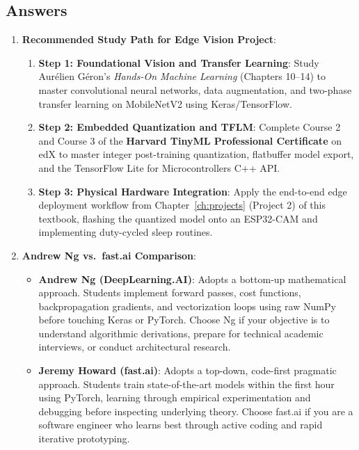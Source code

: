 \subsection*{Answers}

\begin{enumerate}
    \item \textbf{Recommended Study Path for Edge Vision Project}:
    \begin{enumerate}
        \item \textbf{Step 1: Foundational Vision and Transfer Learning}: Study Aurélien Géron's \emph{Hands-On Machine Learning} (Chapters 10--14) to master convolutional neural networks, data augmentation, and two-phase transfer learning on MobileNetV2 using Keras/TensorFlow.
        \item \textbf{Step 2: Embedded Quantization and TFLM}: Complete Course 2 and Course 3 of the \textbf{Harvard TinyML Professional Certificate} on edX to master integer post-training quantization, flatbuffer model export, and the TensorFlow Lite for Microcontrollers C++ API.
        \item \textbf{Step 3: Physical Hardware Integration}: Apply the end-to-end edge deployment workflow from Chapter~\ref{ch:projects} (Project 2) of this textbook, flashing the quantized model onto an ESP32-CAM and implementing duty-cycled sleep routines.
    \end{enumerate}

    \item \textbf{Andrew Ng vs.\ fast.ai Comparison}:
    \begin{itemize}
        \item \textbf{Andrew Ng (DeepLearning.AI)}: Adopts a bottom-up mathematical approach. Students implement forward passes, cost functions, backpropagation gradients, and vectorization loops using raw NumPy before touching Keras or PyTorch. Choose Ng if your objective is to understand algorithmic derivations, prepare for technical academic interviews, or conduct architectural research.
        \item \textbf{Jeremy Howard (fast.ai)}: Adopts a top-down, code-first pragmatic approach. Students train state-of-the-art models within the first hour using PyTorch, learning through empirical experimentation and debugging before inspecting underlying theory. Choose fast.ai if you are a software engineer who learns best through active coding and rapid iterative prototyping.
    \end{itemize}


\end{enumerate}
